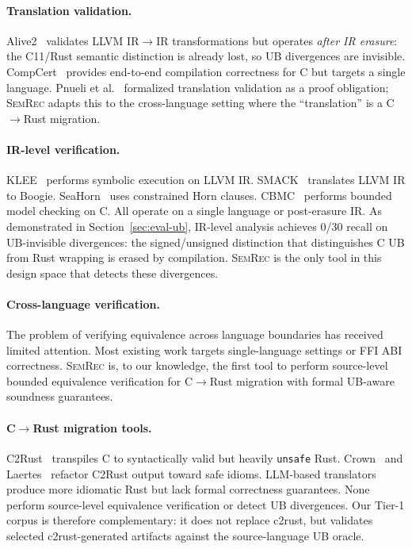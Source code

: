 \documentclass[10pt,a4paper]{article}
\begin{document}
\paragraph{Translation validation.}
Alive2~\cite{lopes2021alive2} validates LLVM IR$\to$IR
transformations but operates \emph{after IR erasure}: the C11/Rust
semantic distinction is already lost, so UB divergences are
invisible.  CompCert~\cite{leroy2009compcert} provides end-to-end
compilation correctness for C but targets a single language.
Pnueli et al.~\cite{pnueli1998translation} formalized translation
validation as a proof obligation; \textsc{SemRec} adapts this to the
cross-language setting where the ``translation'' is a C$\to$Rust
migration.

\paragraph{IR-level verification.}
KLEE~\cite{cadar2008klee} performs symbolic execution on LLVM IR.
SMACK~\cite{rakamaric2014smack} translates LLVM IR to Boogie.
SeaHorn~\cite{gurfinkel2015seahorn} uses constrained Horn clauses.
CBMC~\cite{kroening2014cbmc} performs bounded model checking on C.
All operate on a single language or post-erasure IR.  As demonstrated
in Section~\ref{sec:eval-ub}, IR-level analysis achieves 0/30
recall on UB-invisible divergences: the signed/unsigned distinction
that distinguishes C UB from Rust wrapping is erased by compilation.
\textsc{SemRec} is the only tool in this design space that detects
these divergences.

\paragraph{Cross-language verification.}
The problem of verifying equivalence across language boundaries has
received limited attention.  Most existing work targets single-language
settings or FFI ABI correctness.  \textsc{SemRec} is, to our
knowledge, the first tool to perform source-level bounded equivalence
verification for C$\to$Rust migration with formal UB-aware soundness
guarantees.

\paragraph{C$\to$Rust migration tools.}
C2Rust~\cite{c2rust2019} transpiles C to syntactically valid but
heavily \texttt{unsafe} Rust.  Crown~\cite{zhang2023ownership} and
Laertes~\cite{emre2021translating} refactor C2Rust output toward
safe idioms.  LLM-based translators produce more idiomatic Rust but
lack formal correctness guarantees.  None perform source-level
equivalence verification or detect UB divergences.  Our Tier-1 corpus is
therefore complementary: it does not replace c2rust, but validates selected
c2rust-generated artifacts against the source-language UB oracle.
\end{document}
